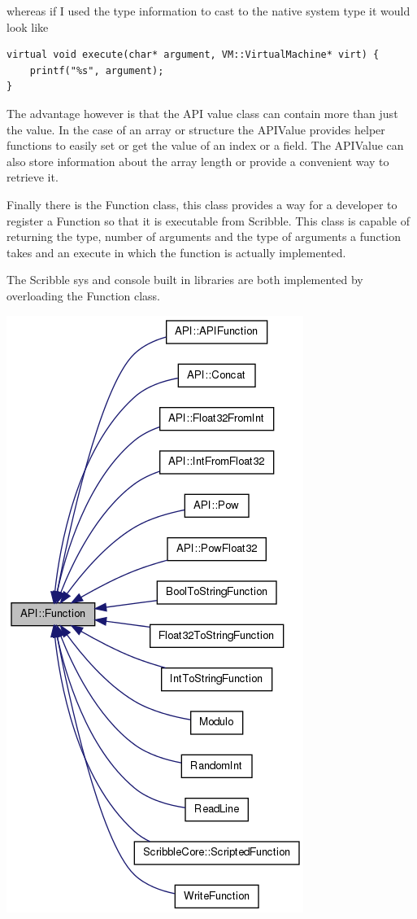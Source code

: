 \documentclass[]{final_report}
\begin{document}
whereas if I used the type information to cast to the native system type it would look like

\begin{verbatim}
virtual void execute(char* argument, VM::VirtualMachine* virt) {
	printf("%s", argument);
}
\end{verbatim}

The advantage however is that the API value class can contain more than just the value. In the case of an array or structure the APIValue provides helper functions to easily set or get the value of an index or a field. The APIValue can also store information about the array length or provide a convenient way to retrieve it.

Finally there is the Function class, this class provides a way for a developer to register a Function so that it is executable from Scribble. This class is capable of returning the type, number of arguments and the type of arguments a function takes and an execute in which the function is actually implemented.

The Scribble sys and console built in libraries are both implemented by overloading the Function class.

\includegraphics[scale=0.4]{"function_class_diagram"}
\end{document}
